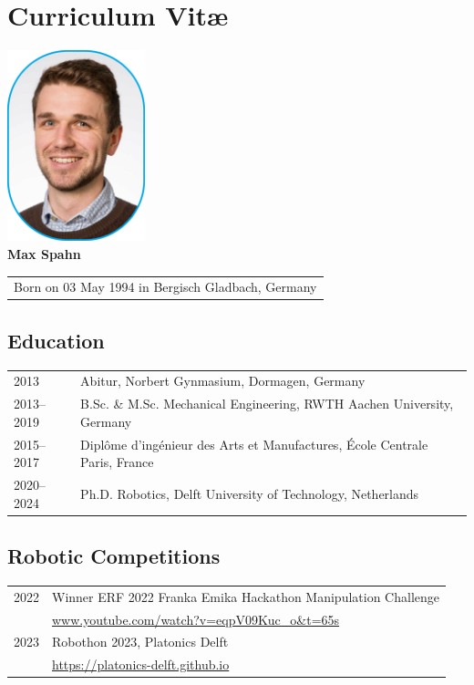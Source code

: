 \chapter*{Curriculum Vit\ae}
\begin{center}
    \includegraphics[width=0.3\textwidth]{src/helpers/cv/max_spahn.png}\\
    \vspace{0.5cm}
    {\Large\textbf{Max Spahn}} \\
    \vspace{0.2cm}
    \begin{tabular}{c}
        Born on 03 May 1994 in Bergisch Gladbach, Germany
    \end{tabular}
\end{center}

\section*{Education}

\begin{tabular}{p{2cm} l}
  2013 & Abitur, Norbert Gynmasium, Dormagen, Germany\\[0.5cm]
    2013--2019 & B.Sc. \& M.Sc. Mechanical Engineering, RWTH Aachen University, Germany\\[0.5cm]
    2015--2017 & Diplôme d'ingénieur des Arts et Manufactures, École Centrale Paris, France\\[0.5cm]
    2020--2024 & Ph.D. Robotics, Delft University of Technology, Netherlands \\
\end{tabular}

\section*{Robotic Competitions}
\begin{tabular}{p{2cm} l}
  2022 & Winner ERF 2022 Franka Emika Hackathon Manipulation
  Challenge\\
  & \url{www.youtube.com/watch?v=eqpV09Kuc_o&t=65s} \\[0.5cm]
  2023 & Robothon 2023, Platonics Delft \\
  & \url{https://platonics-delft.github.io} \\
\end{tabular}
